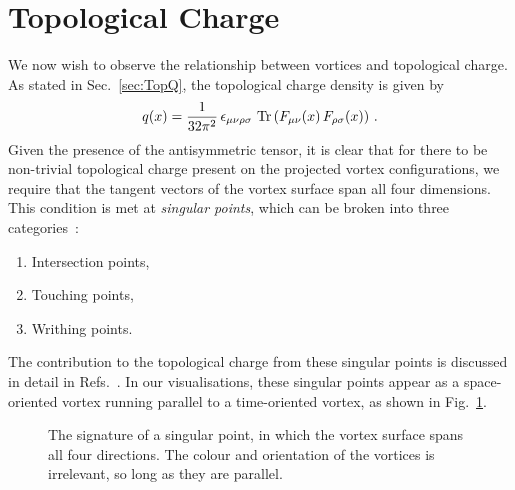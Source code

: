 \section{Topological Charge}\label{sec:TopChargeVis}
We now wish to observe the relationship between vortices and topological charge. As stated in Sec.~\ref{sec:TopQ}, the topological charge density is given by
%
\begin{equation}
q ( x ) = \frac { 1 } { 32 \pi ^ { 2 } } \, \epsilon _ { \mu \nu \rho \sigma } \, \operatorname{Tr}\left( F _ { \mu \nu }( x ) \, F _ { \rho \sigma }(x) \right) \, .
\end{equation}
%
Given the presence of the antisymmetric tensor, it is clear that for there to be non-trivial topological charge present on the projected vortex configurations, we require that the tangent vectors of the vortex surface span all four dimensions. This condition is met at \textit{singular points}, which can be broken into three categories~\cite{Engelhardt:2010ft,Engelhardt:2000wc}:
\begin{enumerate}
\item Intersection points,
\item Touching points,
\item Writhing points.
\end{enumerate}
The contribution to the topological charge from these singular points is discussed in detail in Refs.~\cite{Bruckmann:2003yd,Engelhardt:2010ft,Engelhardt:2000wc,Engelhardt:1999xw}. In our visualisations, these singular points appear as a space-oriented vortex running parallel to a time-oriented vortex, as shown in Fig.~\ref{fig:SingularPoint}.\\
%
\begin{figure}[htb!]
\centering
\scalebox{0.85}{}
\caption[The signature of a singular point, in which the vortex surface spans all four directions.]{\label{fig:SingularPoint} The signature of a singular point, in which the vortex surface spans all four directions. The colour and orientation of the vortices is irrelevant, so long as they are parallel.}
\end{figure}
%

